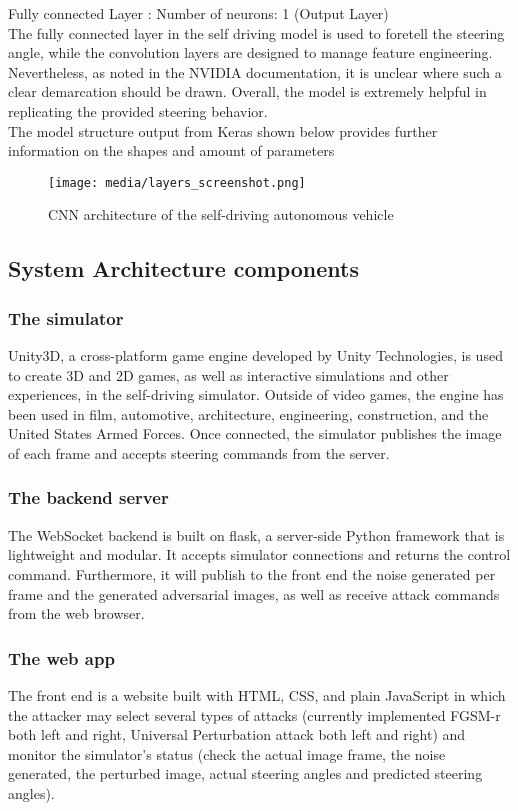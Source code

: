 \documentclass[ 12pt,a4paper,twocolumn,fleqn]{article}
\begin{document}
Fully connected Layer : Number of neurons: 1 (Output Layer)\\
The fully connected layer in the self driving model is used to foretell the steering angle, while the convolution layers are designed to manage feature engineering. Nevertheless, as noted in the NVIDIA documentation, it is unclear where such a clear demarcation should be drawn. Overall, the model is extremely helpful in replicating the provided steering behavior.\\
The model structure output from Keras shown below provides further information on the shapes and amount of parameters
\begin{figure}[H]
\texttt{[image: media/layers\_screenshot.png]}
\centering
\caption{CNN architecture of the self-driving autonomous vehicle}
\end{figure}
\subsection{System Architecture components}
\subsubsection{The simulator}
Unity3D, a cross-platform game engine developed by Unity Technologies, is used to create 3D and 2D games, as well as interactive simulations and other experiences, in the self-driving simulator. Outside of video games, the engine has been used in film, automotive, architecture, engineering, construction, and the United States Armed Forces. Once connected, the simulator publishes the image of each frame and accepts steering commands from the server.
\subsubsection{The backend server}
The WebSocket backend is built on flask, a server-side Python framework that is lightweight and modular. It accepts simulator connections and returns the control command. Furthermore, it will publish to the front end the noise generated per frame and the generated adversarial images, as well as receive attack commands from the web browser.
\subsubsection{The web app}
The front end is a website built with HTML, CSS, and plain JavaScript in which the attacker may select several types of attacks (currently implemented FGSM-r both left and right, Universal Perturbation attack both left and right) and monitor the simulator's status (check the actual image frame, the noise generated, the perturbed image, actual steering angles and predicted steering angles).
\end{document}

